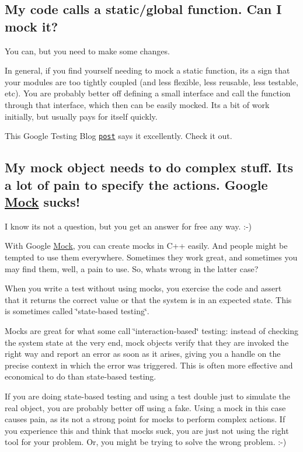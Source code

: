\subsection*{My code calls a static/global function. Can I mock it?}

You can, but you need to make some changes.

In general, if you find yourself needing to mock a static function, it\textquotesingle{}s a sign that your modules are too tightly coupled (and less flexible, less reusable, less testable, etc). You are probably better off defining a small interface and call the function through that interface, which then can be easily mocked. It\textquotesingle{}s a bit of work initially, but usually pays for itself quickly.

This Google Testing Blog \href{http://googletesting.blogspot.com/2008/06/defeat-static-cling.html}{\tt post} says it excellently. Check it out.

\subsection*{My mock object needs to do complex stuff. It\textquotesingle{}s a lot of pain to specify the actions. Google \hyperlink{class_mock}{Mock} sucks!}

I know it\textquotesingle{}s not a question, but you get an answer for free any way. \+:-\/)

With Google \hyperlink{class_mock}{Mock}, you can create mocks in C++ easily. And people might be tempted to use them everywhere. Sometimes they work great, and sometimes you may find them, well, a pain to use. So, what\textquotesingle{}s wrong in the latter case?

When you write a test without using mocks, you exercise the code and assert that it returns the correct value or that the system is in an expected state. This is sometimes called \char`\"{}state-\/based testing\char`\"{}.

Mocks are great for what some call \char`\"{}interaction-\/based\char`\"{} testing\+: instead of checking the system state at the very end, mock objects verify that they are invoked the right way and report an error as soon as it arises, giving you a handle on the precise context in which the error was triggered. This is often more effective and economical to do than state-\/based testing.

If you are doing state-\/based testing and using a test double just to simulate the real object, you are probably better off using a fake. Using a mock in this case causes pain, as it\textquotesingle{}s not a strong point for mocks to perform complex actions. If you experience this and think that mocks suck, you are just not using the right tool for your problem. Or, you might be trying to solve the wrong problem. \+:-\/)

